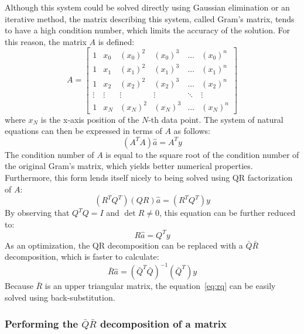 \documentclass{article}
\begin{document}
	Although this system could be solved directly using Gaussian elimination
	or an iterative method, the matrix describing this system, called Gram's
	matrix, tends to have a high condition number, which limits the accuracy
	of the solution. For this reason, the matrix $A$ is defined:
	\begin{equation}
		A = \begin{bmatrix}
			1 & x_0 & (x_0)^2 & (x_0)^3 & \dots & (x_0)^n \\
			1 & x_1 & (x_1)^2 & (x_1)^3 & \dots & (x_1)^n \\
			1 & x_2 & (x_2)^2 & (x_2)^3 & \dots & (x_2)^n \\
			\vdots & \vdots & \vdots & \vdots & \ddots & \vdots \\
			1 & x_N & (x_N)^2 & (x_N)^3 & \dots & (x_N)^n
		\end{bmatrix}
	\end{equation}
	where $x_N$ is the x-axis position of the $N$-th data point. The system
	of natural equations can then be expressed in terms of $A$ as follows:
	\begin{equation}
		(A^TA)\widehat{a} = A^Ty
	\end{equation}
	The condition number of $A$ is equal to the square root of the condition
	number of the original Gram's matrix, which yields better numerical
	properties. Furthermore, this form lends itself nicely to being solved
	using QR factorization of $A$:
	\begin{equation}
		(R^TQ^T)(QR)\widehat{a} = (R^TQ^T)y
	\end{equation}
	By observing that $Q^TQ = I$ and $\det{R} \neq 0$, this equation can be
	further reduced to:
	\begin{equation}
		R\widehat{a} = Q^Ty
	\end{equation}
	As an optimization, the QR decomposition can be replaced with a $\bar{Q}
	\bar{R}$ decomposition, which is faster to calculate:
	\begin{equation}
		\bar{R}\widehat{a} = (\bar{Q}^T\bar{Q})^{-1}(\bar{Q}^T)y
		\label{eq:rq}
	\end{equation}
	Because $\bar{R}$ is an upper triangular matrix, the
	equation~\ref{eq:rq} can be easily solved using back-substitution.
	
	\subsubsection{Performing the $\bar{Q}\bar{R}$ decomposition of a
	matrix}
	
\end{document}

